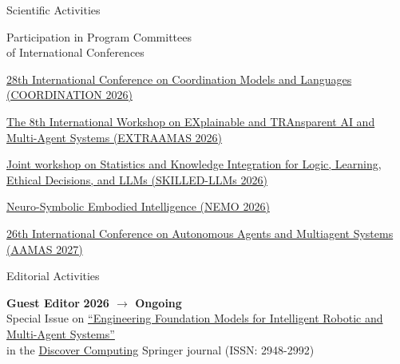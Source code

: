 \documentclass{resume} %
\begin{document}
\begin{rSection}{Scientific Activities}
\begin{rSubsection2}{Participation in Program Committees\\ of International Conferences}
            \item \href{https://www.discotec.org/2026/coordination}{28th International Conference on Coordination Models and Languages (COORDINATION 2026)}
            \item \href{https://extraamas.ehealth.hevs.ch/index.html}{The 8th International Workshop on EXplainable and TRAnsparent AI and Multi-Agent Systems (EXTRAAMAS 2026)}
            \item \href{https://skilled-llms.github.io/2026/}{Joint workshop on Statistics and Knowledge Integration for Logic, Learning, Ethical Decisions, and LLMs (SKILLED-LLMs 2026)}
            \item \href{https://nemo.semantic.review/}{Neuro-Symbolic Embodied Intelligence (NEMO 2026)}
            \item \href{https://warwick.ac.uk/fac/sci/dcs/aamas2027}{26th International Conference on Autonomous Agents and Multiagent Systems (AAMAS 2027)}
        \end{rSubsection2}


        \begin{rSubsection2}{Editorial Activities}
            \item\textbf{ Guest Editor }\hfill \textbf{2026 $\rightarrow$ Ongoing}
            \\Special Issue on \href{https://link.springer.com/collections/jcjdgeicdj}{``Engineering Foundation Models for Intelligent Robotic and Multi-Agent Systems''}
            \\in the \href{https://link.springer.com/journal/10791}{Discover Computing} Springer journal (ISSN: 2948-2992)
        \end{rSubsection2}



\end{rSection}
\end{document}
